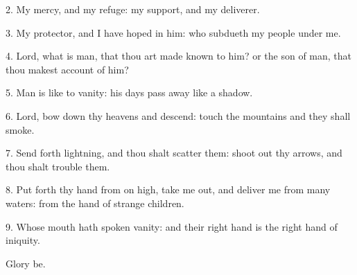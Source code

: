  
 2. My mercy, and my refuge: my support, and my deliverer.
 
 3. My protector, and I have hoped in him: who subdueth my people under me. 
 
 4. Lord, what is man, that thou art made known to him? or the son of man, that thou makest account of him? 
 
 5. Man is like to vanity: his days pass away like a shadow. 
 
 6. Lord, bow down thy heavens and descend: touch the mountains and they shall smoke.

7. Send forth lightning, and thou shalt scatter them:
shoot out thy arrows, and thou shalt trouble them.

8. Put forth thy hand from on high, take me out, and deliver me from many waters:
from the hand of strange children. 

9. Whose mouth hath spoken vanity: and their right hand is the right hand of iniquity. 

Glory be.

